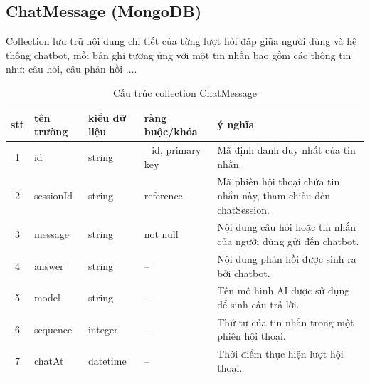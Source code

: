 \documentclass[../DoAn.tex]{subfiles}
\begin{document}
\newpage
\subsection{ChatMessage (MongoDB)}
Collection lưu trữ nội dung chi tiết của từng lượt hỏi đáp giữa người dùng và hệ thống chatbot, mỗi bản ghi tương ứng với một tin nhắn bao gồm các thông tin như: câu hỏi, câu phản hồi ....
\begin{table}[htbp]
    \centering
    \small
    \renewcommand{\arraystretch}{1.1}
    \label{tab:mongodb-chat-message}

    \begin{tabularx}{\textwidth}{|c|p{3cm}|p{2.8cm}|p{3.5cm}|>{\raggedright\arraybackslash}X|}
        \hline
        \textbf{stt} & \textbf{tên trường} & \textbf{kiểu dữ liệu} & \textbf{ràng buộc/khóa} & \textbf{ý nghĩa}                                                  \\
        \hline
        1            & id                  & string                & \_id, primary key       & Mã định danh duy nhất của tin nhắn.                               \\
        \hline
        2            & sessionId           & string                & reference               & Mã phiên hội thoại chứa tin nhắn này, tham chiếu đến chatSession. \\
        \hline
        3            & message             & string                & not null                & Nội dung câu hỏi hoặc tin nhắn của người dùng gửi đến chatbot.    \\
        \hline
        4            & answer              & string                & --                      & Nội dung phản hồi được sinh ra bởi chatbot.                       \\
        \hline
        5            & model               & string                & --                      & Tên mô hình AI được sử dụng để sinh câu trả lời.                  \\
        \hline
        6            & sequence            & integer               & --                      & Thứ tự của tin nhắn trong một phiên hội thoại.                    \\
        \hline
        7            & chatAt              & datetime              & --                      & Thời điểm thực hiện lượt hội thoại.                               \\
        \hline
    \end{tabularx}
    \caption{Cấu trúc collection ChatMessage}
\end{table}
\end{document}
